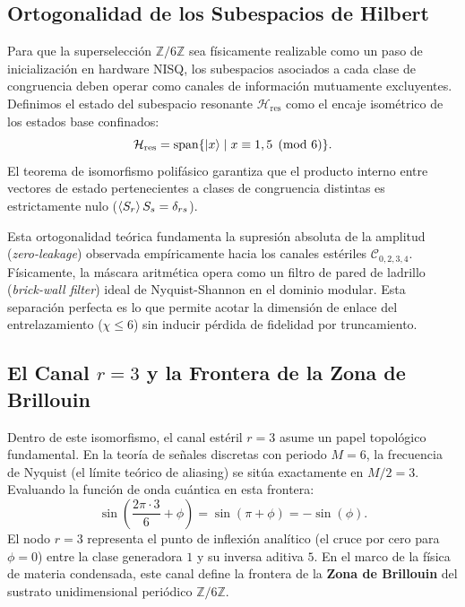 \documentclass[12pt,a4paper]{article}
\theoremstyle{plain}
\theoremstyle{definition}
\theoremstyle{remark}
\begin{document}
\subsection{Ortogonalidad de los Subespacios de Hilbert}

Para que la superselección $\mathbb{Z}/6\mathbb{Z}$ sea físicamente realizable como un paso de inicialización en hardware NISQ, los subespacios asociados a cada clase de congruencia deben operar como canales de información mutuamente excluyentes. Definimos el estado del subespacio resonante $\mathcal{H}_{\text{res}}$ como el encaje isométrico de los estados base confinados:
\begin{equation}
\mathcal{H}_{\text{res}} = \text{span}\{\ket{x} \mid x \equiv 1, 5 \pmod 6\}.
\end{equation}
El teorema de isomorfismo polifásico garantiza que el producto interno entre vectores de estado pertenecientes a clases de congruencia distintas es estrictamente nulo ($\braket{S_r}{S_s} = \delta_{rs}$). 

Esta ortogonalidad teórica fundamenta la supresión absoluta de la amplitud (\textit{zero-leakage}) observada empíricamente hacia los canales estériles $\mathcal{C}_{0,2,3,4}$. Físicamente, la máscara aritmética opera como un filtro de pared de ladrillo (\textit{brick-wall filter}) ideal de Nyquist-Shannon en el dominio modular. Esta separación perfecta es lo que permite acotar la dimensión de enlace del entrelazamiento ($\chi \le 6$) sin inducir pérdida de fidelidad por truncamiento.

\subsection{El Canal $r=3$ y la Frontera de la Zona de Brillouin}

Dentro de este isomorfismo, el canal estéril $r=3$ asume un papel topológico fundamental. En la teoría de señales discretas con periodo $M=6$, la frecuencia de Nyquist (el límite teórico de aliasing) se sitúa exactamente en $M/2 = 3$. Evaluando la función de onda cuántica en esta frontera:
\begin{equation}
\sin\left(\frac{2\pi \cdot 3}{6} + \phi\right) = \sin(\pi + \phi) = -\sin(\phi).
\end{equation}
El nodo $r=3$ representa el punto de inflexión analítico (el cruce por cero para $\phi=0$) entre la clase generadora $1$ y su inversa aditiva $5$. En el marco de la física de materia condensada, este canal define la frontera de la \textbf{Zona de Brillouin} del sustrato unidimensional periódico $\mathbb{Z}/6\mathbb{Z}$. 
\end{document}
